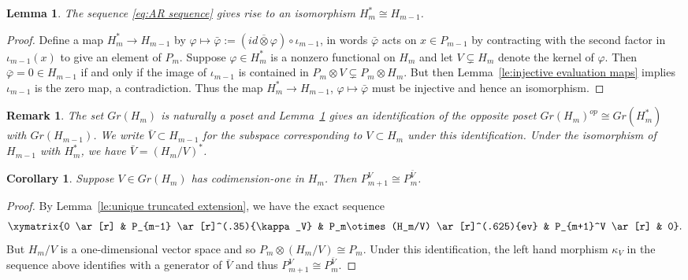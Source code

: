 \documentclass{amsart}
\newtheorem{corollary}[theorem]{Corollary}
\newtheorem{lemma}[theorem]{Lemma}
\newtheorem{remark}[theorem]{Remark}
\begin{document}
\begin{lemma}
  \label{le:preprojective homomorphism duality}
  The sequence \eqref{eq:AR sequence} gives rise to an isomorphism $H_m^*\cong H_{m-1}$.
\end{lemma}
\begin{proof}
  Define a map $H_m^*\to H_{m-1}$ by $\varphi\mapsto\bar{\varphi}:=(id\overline{\otimes}\varphi)\circ\iota_{m-1}$, in words $\bar{\varphi}$ acts on $x\in P_{m-1}$ by contracting with the second factor in $\iota_{m-1}(x)$ to give an element of $P_m$.
  Suppose $\varphi\in H_m^*$ is a nonzero functional on $H_m$ and let $V\subsetneq H_m$ denote the kernel of $\varphi$.
  Then $\bar{\varphi}=0\in H_{m-1}$ if and only if the image of $\iota_{m-1}$ is contained in $P_m\otimes V\subsetneq P_m\otimes H_m$.
  But then Lemma~\ref{le:injective evaluation maps} implies $\iota_{m-1}$ is the zero map, a contradiction.
  Thus the map $H_m^*\to H_{m-1}$, $\varphi\mapsto\bar{\varphi}$ must be injective and hence an isomorphism.
\end{proof}
\begin{remark}
  The set $Gr(H_m)$ is naturally a poset and Lemma~\ref{le:preprojective homomorphism duality} gives an identification of the opposite poset $Gr(H_m)^{op}\cong Gr(H_m^*)$ with $Gr(H_{m-1})$.
  We write $\bar{V}\subset H_{m-1}$ for the subspace corresponding to $V\subset H_m$ under this identification.
  Under the isomorphism of $H_{m-1}$ with $H_m^*$, we have $\bar{V}=(H_m/V)^*$.
\end{remark}

\begin{corollary}
  \label{cor:truncated preprojective isomorphism}
  Suppose $V\in Gr(H_m)$ has codimension-one in $H_m$.  Then $P_{m+1}^V\cong P_m^{\bar{V}}$.
\end{corollary}
\begin{proof}
  By Lemma~\ref{le:unique truncated extension}, we have the exact sequence
  \[\xymatrix{0 \ar[r] & P_{m-1} \ar[r]^(.35){\kappa_V} & P_m\otimes(H_m/V) \ar[r]^(.625){ev} & P_{m+1}^V \ar[r] & 0}.\]
  But $H_m/V$ is a one-dimensional vector space and so $P_m\otimes(H_m/V)\cong P_m$.
  Under this identification, the left hand morphism $\kappa_V$ in the sequence above identifies with a generator of $\bar{V}$ and thus $P_{m+1}^V\cong P_m^{\bar{V}}$.
\end{proof}
\end{document}
